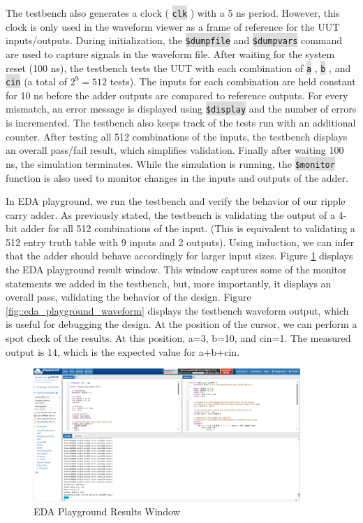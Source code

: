 \documentclass[fleqn]{article}
\newcommand{\code}[1]{%
	\colorbox{Gainsboro}{\texttt{#1}}%
}
\begin{document}
\begin{enumerate}
		 The testbench also generates a clock (\code{clk}) with a 5 ns period. However, this clock is only used in the waveform viewer as a frame of reference for the UUT inputs/outputs. During initialization, the \code{\$dumpfile} and \code{\$dumpvars} command are used to capture signals in the waveform file. After waiting for the system reset (100 ns), the testbench tests the UUT with each combination of \code{a}, \code{b}, and \code{cin} (a total of $2^9=512$ tests). The inputs for each combination are held constant for 10 ns before the adder outputs are compared to reference outputs. For every mismatch, an error message is displayed using \code{\$display} and the number of errors is incremented. The testbench also keeps track of the tests run with an additional counter. After testing all 512 combinations of the inputs, the testbench displays an overall pass/fail result, which simplifies validation. Finally after waiting 100 ns, the simulation terminates. While the simulation is running, the \code{\$monitor} function is also used to monitor changes in the inputs and outputs of the adder.
		  
		 In EDA playground, we run the testbench and verify the behavior of our ripple carry adder. As previously stated, the testbench is validating the output of a 4-bit adder for all 512 combinations of the input. (This is equivalent to validating a 512 entry truth table with 9 inputs and 2 outputs). Using induction, we can infer that the adder should behave accordingly for larger input sizes. Figure \ref{fig::eda_playground_results_window} displays the EDA playground result window. This window captures some of the monitor statements we added in the testbench, but, more importantly, it displays an overall pass, validating the behavior of the design. Figure \ref{fig::eda_playground_waveform} displays the testbench waveform output, which is useful for debugging the design. At the position of the cursor, we can perform a spot check of the results. At this position, a=3, b=10, and cin=1. The measured output is 14, which is the expected value for a+b+cin.
		 
		 \begin{figure}[H]
		 	\centerline{\includegraphics[width=0.9\textwidth]{eda_playground_results_window.png}}
			\caption{EDA Playground Results Window}
			\label{fig::eda_playground_results_window}
		 \end{figure}
		 

\end{enumerate}
\end{document}
